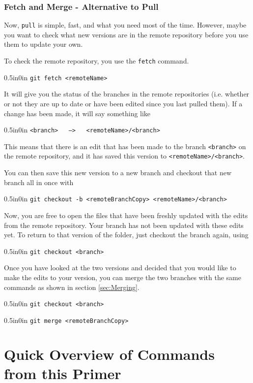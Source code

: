 \documentclass[11pt]{article}
\newcommand{\code}[1]{\begin{adjustwidth}{0.5in}{0in}
    \texttt{#1}
    \end{adjustwidth}}
\begin{document}
\subsubsection{Fetch and Merge - Alternative to Pull}

Now, \texttt{pull} is simple, fast, and what you need most of the time.  However, maybe you want to check what new versions are in the remote repository before you use them to update your own.  

To check the remote repository, you use the \texttt{fetch} command.

\code{git fetch <remoteName>}

It will give you the status of the branches in the remote repositories (i.e. whether or not they are up to date or have been edited since you last pulled them).  If a change has been made, it will say something like

\code{<branch> \ \ --> \ \ <remoteName>/<branch>}

This means that there is an edit that has been made to the branch \texttt{<branch>} on the remote repository, and it has saved this version to \texttt{<remoteName>/<branch>}.

You can then save this new version to a new branch and checkout that new branch all in once with

\code{git checkout -b <remoteBranchCopy> <remoteName>/<branch>}

Now, you are free to open the files that have been freshly updated with the edits from the remote repository.  Your branch has not been updated with these edits yet.  To return to that version of the folder, just checkout the branch again, using
\code{git checkout <branch>}

Once you have looked at the two versions and decided that you would like to make the edits to your version, you can merge the two branches with the same commands as shown in section \ref{sec:Merging}.  

\code{git checkout <branch>}
\code{git merge <remoteBranchCopy>}




\newpage
{}
\thispagestyle{empty} %

\section{Quick Overview of Commands from this Primer}
\end{document}
